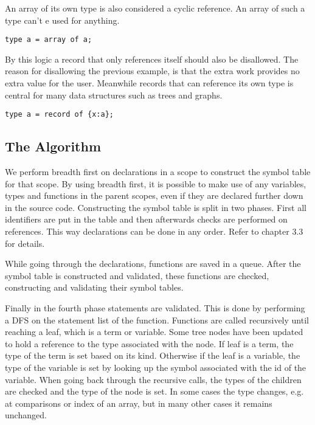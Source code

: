 \documentclass{article}
\begin{document}
An array of its own type is also considered a cyclic reference. An array of such a type can't e used for anything.
\begin{lstlisting}
type a = array of a;
\end{lstlisting}

By this logic a record that only references itself should also be disallowed. The reason for disallowing the previous example, is that the extra work provides no extra value for the user. Meanwhile records that can reference its own type is central for many data structures such as trees and graphs. 
\begin{lstlisting}
type a = record of {x:a};
\end{lstlisting}

\subsection{The Algorithm}

We perform breadth first on declarations in a scope to construct the symbol table for that scope. By using breadth first, it is possible to make use of any variables, types and functions in the parent scopes, even if they are declared further down in the source code. Constructing the symbol table is split in two phases. First all identifiers are put in the table and then afterwards checks are performed on references. This way declarations can be done in any order. Refer to chapter 3.3 for details.

While going through the declarations, functions are saved in a queue. After the symbol table is constructed and validated, these functions are checked, constructing and validating their symbol tables.

Finally in the fourth phase statements are validated. This is done by performing a DFS on the statement list of the function.  Functions are called recursively until reaching a leaf, which is a term or variable. Some tree nodes have been updated to hold a reference to the type associated with the node. If leaf is a term, the type of the term is set based on its kind. Otherwise if the leaf is a variable, the type of the variable is set by looking up the symbol associated with the id of the variable. When going back through the recursive calls, the types of the children are checked and the  type of the node is set. In some cases the type changes, e.g. at comparisons or index of an array, but in many other cases it remains unchanged. 
\end{document}
